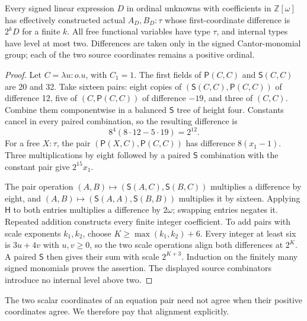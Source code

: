 \begin{lemma}\label{lem:pair-compiler}
Every signed linear expression $D$ in ordinal unknowns with coefficients
in $\mathbb Z[\omega]$ has effectively constructed actual $A_D,B_D:\tau$
whose first-coordinate difference is $2^kD$ for a finite $k$.
All free functional variables have type $\tau$, and internal types have
level at most two.  Differences are taken only in the signed Cantor-monomial
group; each of the two source coordinates remains a positive ordinal.
\end{lemma}
\begin{proof}
Let $C=\lambda u:o.u$, with $C_1=1$.  The first fields of
$\mathsf P(C,C)$ and $\mathsf S(C,C)$ are 20 and 32.  Take sixteen pairs:
eight copies of $(\mathsf S(C,C),\mathsf P(C,C))$ of difference 12,
five of $(C,\mathsf P(C,C))$ of difference $-19$, and three of $(C,C)$.
Combine them componentwise in a balanced $\mathsf S$ tree of height four.
Constants cancel in every paired combination, so the resulting difference is
\[
 8^4(8\cdot12-5\cdot19)=2^{12}.
\]
For a free $X:\tau$, the pair
$(\mathsf P(X,C),\mathsf P(C,C))$ has difference $8(x_1-1)$.
Three multiplications by eight followed by a paired $\mathsf S$ combination
with the constant pair give $2^{15}x_1$.

The pair operation $(A,B)\mapsto(\mathsf S(A,C),\mathsf S(B,C))$
multiplies a difference by eight, and
$(A,B)\mapsto(\mathsf S(A,A),\mathsf S(B,B))$ multiplies it by sixteen.
Applying $\mathsf H$ to both entries multiplies a difference by $2\omega$;
swapping entries negates it.  Repeated addition constructs every finite
integer coefficient.  To add pairs with scale exponents $k_1,k_2$, choose
$K\ge\max(k_1,k_2)+6$.  Every integer at least six is $3u+4v$ with
$u,v\ge0$, so the two scale operations align both differences at $2^K$.
A paired $\mathsf S$ then gives their sum with scale $2^{K+3}$.
Induction on the finitely many signed monomials proves the assertion.
The displayed source combinators introduce no internal level above two.
\end{proof}

The two scalar coordinates of an equation pair need not agree when their
positive coordinates agree.  We therefore pay that alignment explicitly.


